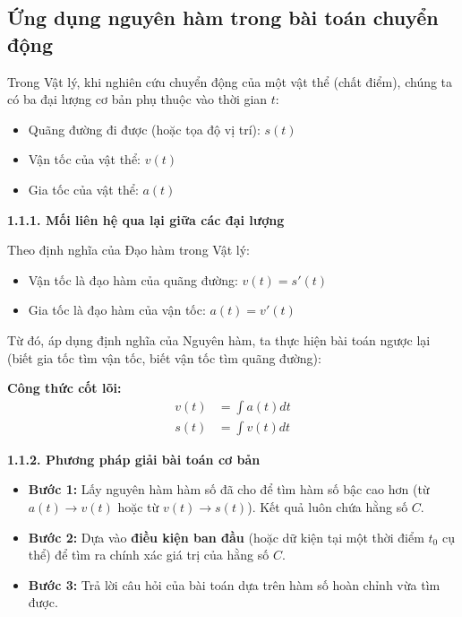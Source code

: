 \documentclass[12pt]{article}
\begin{document}
	\subsection{Ứng dụng nguyên hàm trong bài toán chuyển động}
	
	Trong Vật lý, khi nghiên cứu chuyển động của một vật thể (chất điểm), chúng ta có ba đại lượng cơ bản phụ thuộc vào thời gian $t$:
	\begin{itemize}
		\item Quãng đường đi được (hoặc tọa độ vị trí): $s(t)$
		\item Vận tốc của vật thể: $v(t)$
		\item Gia tốc của vật thể: $a(t)$
	\end{itemize}
	
	\textbf{1.1.1. Mối liên hệ qua lại giữa các đại lượng}
	
	Theo định nghĩa của Đạo hàm trong Vật lý:
	\begin{itemize}
		\item Vận tốc là đạo hàm của quãng đường: $v(t) = s'(t)$
		\item Gia tốc là đạo hàm của vận tốc: $a(t) = v'(t)$
	\end{itemize}
	
	Từ đó, áp dụng định nghĩa của Nguyên hàm, ta thực hiện bài toán ngược lại (biết gia tốc tìm vận tốc, biết vận tốc tìm quãng đường):
	\begin{tcolorbox}[colback=blue!5!white, colframe=blue!75!black, rounded corners, boxrule=1pt]
		\textbf{Công thức cốt lõi:}
		\begin{align*}
			v(t) &= \int a(t)dt \\
			s(t) &= \int v(t)dt
		\end{align*}
	\end{tcolorbox}
	
	\textbf{1.1.2. Phương pháp giải bài toán cơ bản}
	
	\begin{itemize}
		\item \textbf{Bước 1:} Lấy nguyên hàm hàm số đã cho để tìm hàm số bậc cao hơn (từ $a(t) \rightarrow v(t)$ hoặc từ $v(t) \rightarrow s(t)$). Kết quả luôn chứa hằng số $C$.
		\item \textbf{Bước 2:} Dựa vào \textbf{điều kiện ban đầu} (hoặc dữ kiện tại một thời điểm $t_0$ cụ thể) để tìm ra chính xác giá trị của hằng số $C$. 
		\item \textbf{Bước 3:} Trả lời câu hỏi của bài toán dựa trên hàm số hoàn chỉnh vừa tìm được.
	\end{itemize}
	
\end{document}
